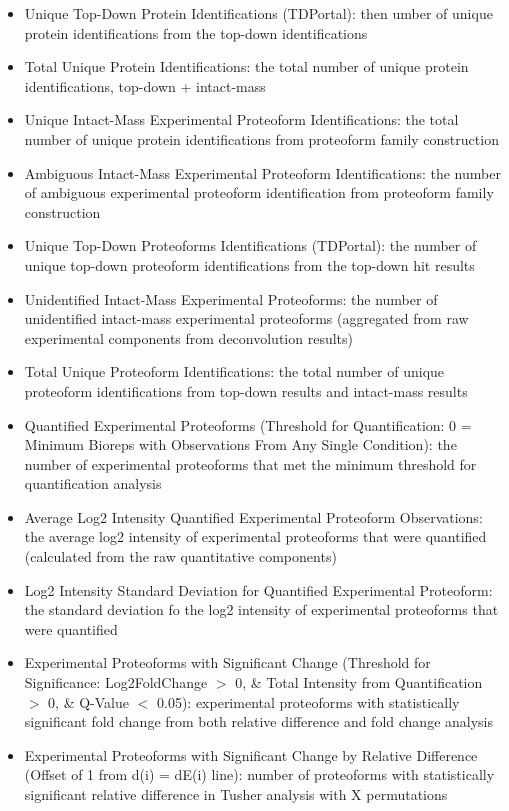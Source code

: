 \begin{itemize}
\begin{itemize}
\item Unique Top-Down Protein Identifications (TDPortal): then umber of unique protein identifications from the top-down identifications
\item Total Unique Protein Identifications: the total number of unique protein identifications, top-down + intact-mass
\item Unique Intact-Mass Experimental Proteoform Identifications: the total number of unique protein identifications from proteoform family construction
\item Ambiguous Intact-Mass Experimental Proteoform Identifications: the number of ambiguous experimental proteoform identification from proteoform family construction
\item Unique Top-Down Proteoforms Identifications (TDPortal): the number of unique top-down proteoform identifications from the top-down hit results
\item Unidentified Intact-Mass Experimental Proteoforms: the number of unidentified intact-mass experimental proteoforms (aggregated from raw experimental components from deconvolution results)
\item Total Unique Proteoform Identifications: the total number of unique proteoform identifications from top-down results and intact-mass results
\item Quantified Experimental Proteoforms (Threshold for Quantification: 0 = Minimum Bioreps with Observations From Any Single Condition): the number of experimental proteoforms that met the minimum threshold for quantification analysis
\item Average Log2 Intensity Quantified Experimental Proteoform Observations: the average log2 intensity of experimental proteoforms that were quantified (calculated from the raw quantitative components)
\item Log2 Intensity Standard Deviation for Quantified Experimental Proteoform: the standard deviation fo the log2 intensity of experimental proteoforms that were quantified
\item Experimental Proteoforms with Significant Change (Threshold for Significance: Log2FoldChange $>$ 0, \& Total Intensity from Quantification $>$ 0, \& Q-Value $<$ 0.05): experimental proteoforms with statistically significant fold change from both relative difference and fold change analysis
\item Experimental Proteoforms with Significant Change by Relative Difference (Offset of 1 from d(i) = dE(i) line): number of proteoforms with statistically significant relative difference in Tusher analysis with X permutations

\end{itemize}
\end{itemize}
